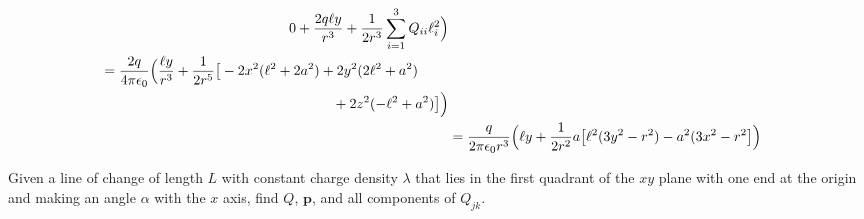\documentclass[crop=false,class=book,oneside]{standalone}
\begin{document}
\begin{solution}
\begin{subequations}
\begin{align}
                            0+\frac{2q\ell{y}}{r^{3}}
                             +\frac{1}{2r^{3}}\sum_{i=1}^{3}Q_{ii}\ell_{i}^{2}\Big)\\
                        \begin{split}
                            &=\frac{2q}{4\pi\epsilon_{0}}
                                \Big(\frac{\ell{y}}{r^{3}}+
                                     \frac{1}{2r^{5}}
                                     \big[-2x^{2}(\ell^{2}+2a^{2})
                                          +2y^{2}(2\ell^{2}+a^{2})\\
                                          &\hspace{2.3in}+2z^{2}(-\ell^{2}+a^{2})
                                     \big]
                                \Big)
                        \end{split}\\
                        &=\frac{q}{2\pi\epsilon_{0}r^{3}}
                            \Big(\ell{y}+\frac{1}{2r^{2}}
                                 a\big[\ell^{2}(3y^{2}-r^{2})-a^{2}(3x^{2}-r^{2}\big]
                            \Big)
                    \end{align}
                \end{subequations}
            \end{solution}
            \begin{problem}
                Given a line of change of length $L$ with constant charge
                density $\lambda$ that lies in the first quadrant of the
                $xy$ plane with one end at the origin and making an angle
                $\alpha$ with the $x$ axis, find $Q$, $\mathbf{p}$, and
                all components of $Q_{jk}$. 
            \end{problem}
\end{document}
